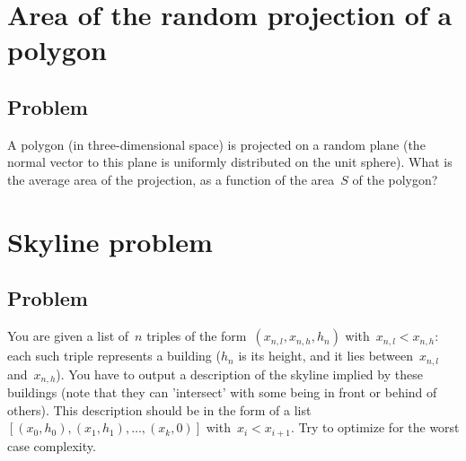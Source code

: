 \documentclass{article}
\begin{document}
\section{Area of the random projection of a polygon}

\subsection{Problem}
A polygon (in three-dimensional space) is projected on a random plane (the normal vector to this plane is uniformly distributed on the unit sphere). What is the average area of the projection, as a function of the area~$S$ of the polygon?


\section{Skyline problem}

\subsection{Problem}

You are given a list of~$n$ triples of the form~$(x_{n,l},x_{n,h},h_n)$ with~$x_{n,l}<x_{n,h}$: each such triple represents a building ($h_n$ is its height, and it lies between~$x_{n,l}$ and~$x_{n,h}$). You have to output a description of the skyline implied by these buildings (note that they can 'intersect' with some being in front or behind of others). This description should be in the form of a list~$[(x_0,h_0),(x_1,h_1),\ldots ,(x_k,0)]$ with~$x_i<x_{i+1}$. Try to optimize for the worst case complexity.
\end{document}
